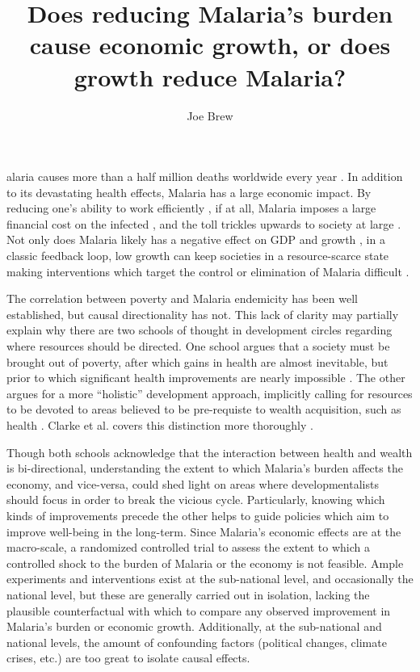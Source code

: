 \documentclass[9pt,twocolumn,twoside,lineno]{pnas-new}
\title{Does reducing Malaria's burden cause economic growth, or does growth reduce Malaria?}
\author[a,b,1]{Joe Brew}
\affil[a]{Barcelona Institute for Global Health: c/ Rosselló, 132, 5è 2a. 08036, Barcelona, Catalonia}
\affil[b]{VU University Amsterdam: De Boelelaan 1105, 1081 HV Amsterdam, Netherlands}
\begin{document}
\maketitle
\thispagestyle{firststyle}


alaria causes more than a half million deaths worldwide every year \cite{White}. In addition to its devastating health effects, Malaria has a large economic impact.  By reducing one’s ability to work efficiently \cite{Nonvignon2016-vt}, if at all, Malaria imposes a large financial cost on the infected \cite{Asenso-Okyere1997-wj} \cite{Ajani2010-dd}, and the toll trickles upwards to society at large \cite{Sachs2002-ig}. Not only does Malaria likely has a negative effect on GDP and growth \cite{McCarthy2000-wl, Orem2012-kr, Hong2011-sa, Sachs2002-ig}, in a classic feedback loop, low growth can keep societies in a resource-scarce state making interventions which target the control or elimination of Malaria difficult \cite{White, Purdy2013-rt, Howard2017-pk, Phillips1998-ky}. 

The correlation between poverty and Malaria endemicity has been well established, but causal directionality has not. This lack of clarity may partially explain why there are two schools of thought in development circles regarding where resources should be directed. One school argues that a society must be brought out of poverty, after which gains in health are almost inevitable, but prior to which significant health improvements are nearly impossible \cite{Musgrove1996-hm}.  The other argues for a more “holistic” development approach, implicitly calling for resources to be devoted to areas believed to be pre-requiste to wealth acquisition, such as health \cite{Storm2008-dd, Sen_undated-gp}.  Clarke et al. covers this distinction more thoroughly \cite{Clarke_JA2016-ik}.

Though both schools acknowledge that the interaction between health and wealth is bi-directional, understanding the extent to which Malaria’s burden affects the economy, and vice-versa, could shed light on areas where developmentalists should focus in order to break the vicious cycle. Particularly, knowing which kinds of improvements precede the other helps to guide policies which aim to improve well-being in the long-term. Since Malaria’s economic effects are at the macro-scale, a randomized controlled trial to assess the extent to which a controlled shock to the burden of Malaria or the economy is not feasible. Ample experiments and interventions exist at the sub-national level, and occasionally the national level, but these are generally carried out in isolation, lacking the plausible counterfactual with which to compare any observed improvement in Malaria’s burden or economic growth. Additionally, at the sub-national and national levels, the amount of confounding factors (political changes, climate crises, etc.) are too great to isolate causal effects. 
\end{document}
